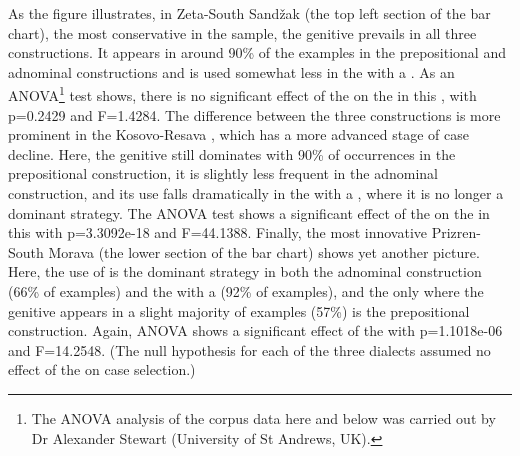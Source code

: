 \documentclass[output=paper,colorlinks,citecolor=brown]{langscibook}
\begin{document}
As the figure illustrates, in Zeta-South Sandžak (the top left section of the bar chart), the most conservative  in the sample, the genitive prevails in all three constructions. It appears in around 90\% of the examples in the prepositional and adnominal constructions and is used somewhat less in the  with a . As an ANOVA\footnote{The ANOVA analysis of the corpus data here and below was carried out by Dr Alexander Stewart (University of St Andrews, UK).} test shows, there is no significant effect of the  on the  in this , with p=0.2429 and F=1.4284. The difference between the three constructions is more prominent in the Kosovo-Resava , which has a more advanced stage of case decline. Here, the genitive still dominates with 90\% of occurrences in the prepositional construction, it is slightly less frequent in the adnominal construction, and its use falls dramatically in the  with a , where it is no longer a dominant strategy. The ANOVA test shows a significant effect of the  on the  in this  with p=3.3092e-18 and F=44.1388. Finally, the most innovative Prizren-South Morava  (the lower section of the bar chart) shows yet another picture. Here, the use of  is the dominant strategy in both the adnominal construction (66\% of examples) and the  with a  (92\% of examples), and the only  where the genitive appears in a slight majority of examples (57\%) is the prepositional construction. Again, ANOVA shows a significant effect of the  with p=1.1018e-06 and F=14.2548. (The null hypothesis for each of the three dialects assumed no effect of the  on case selection.)
\end{document}
